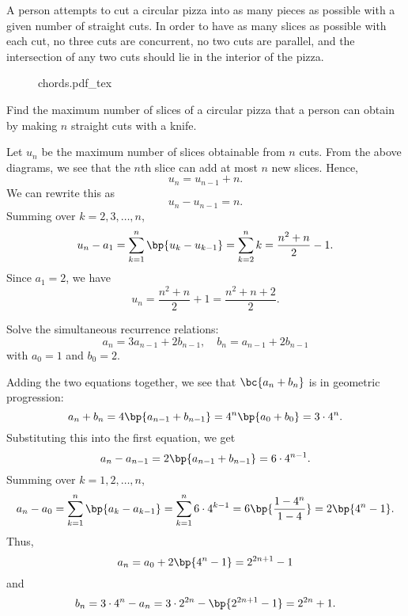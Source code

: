 \begin{problem}[\chili]
    A person attempts to cut a circular pizza into as many pieces as possible with a given number of straight cuts. In order to have as many slices as possible with each cut, no three cuts are concurrent, no two cuts are parallel, and the intersection of any two cuts should lie in the interior of the pizza. 
    
    \begin{figure}[H]
        \centering
        {chords.pdf_tex}
    \end{figure}

    Find the maximum number of slices of a circular pizza that a person can obtain by making $n$ straight cuts with a knife.
\end{problem}
\begin{solution}
    Let $u_n$ be the maximum number of slices obtainable from $n$ cuts. From the above diagrams, we see that the $n$th slice can add at most $n$ new slices. Hence, \[u_n = u_{n-1} + n.\] We can rewrite this as \[u_n - u_{n-1} = n.\] Summing over $k = 2, 3, \dots, n$, \[u_n - a_1 = \sum_{k = 1}^n \bp{u_k - u_{k-1}} = \sum_{k = 2}^n k = \frac{n^2 + n}{2} - 1.\] Since $a_1 = 2$, we have \[u_n = \frac{n^2 + n}{2} + 1 = \frac{n^2 + n + 2}{2}.\]
\end{solution}

\begin{problem}[\chili]
    Solve the simultaneous recurrence relations: \[a_n = 3a_{n-1} + 2b_{n-1}, \quad b_n = a_{n-1} + 2b_{n-1}\] with $a_0 = 1$ and $b_0 = 2$.
\end{problem}
\begin{solution}
    Adding the two equations together, we see that $\bc{a_n + b_n}$ is in geometric progression: \[a_n + b_n = 4\bp{a_{n-1} + b_{n-1}} = 4^n \bp{a_0 + b_0} = 3 \cdot 4^n.\] Substituting this into the first equation, we get \[a_n - a_{n-1} = 2\bp{a_{n-1} + b_{n-1}} = 6 \cdot 4^{n-1}.\] Summing over $k = 1, 2, \dots, n$, \[a_n - a_0 = \sum_{k = 1}^{n} \bp{a_k - a_{k-1}} = \sum_{k = 1}^n 6 \cdot 4^{k-1} = 6 \bp{\frac{1 - 4^n}{1 - 4}} = 2\bp{4^n - 1}.\] Thus, \[a_n = a_0 + 2\bp{4^n - 1} = 2^{2n+1} - 1\] and \[b_n = 3\cdot4^n - a_n = 3\cdot 2^{2n} - \bp{2^{2n+1} - 1} = 2^{2n} + 1.\]
\end{solution}